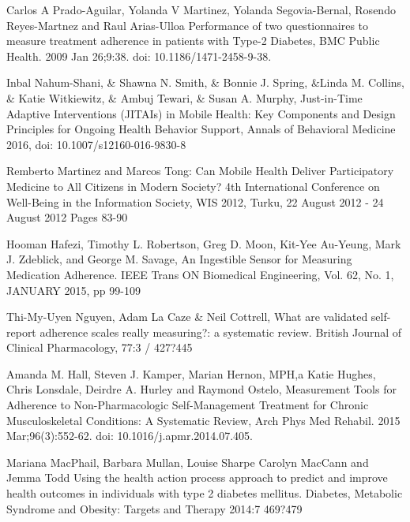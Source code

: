 \documentclass{llncs}
\begin{document}
\begin{thebibliography}{99}

 Carlos A Prado-Aguilar, Yolanda V Martinez, Yolanda Segovia-Bernal, Rosendo Reyes-Martnez and Raul Arias-Ulloa Performance of two questionnaires to measure treatment adherence in patients with Type-2 Diabetes, BMC Public Health. 2009 Jan 26;9:38. doi: 10.1186/1471-2458-9-38.


 Inbal Nahum-Shani, \& Shawna N. Smith,  \& Bonnie J. Spring,  \&Linda M. Collins,  \& Katie Witkiewitz,  \& Ambuj Tewari, \& Susan A. Murphy, Just-in-Time Adaptive Interventions (JITAIs) in Mobile Health: Key Components and Design Principles for Ongoing Health Behavior Support, Annals of Behavioral Medicine 2016, doi: 10.1007/s12160-016-9830-8

 Remberto Martinez and Marcos Tong: Can Mobile Health Deliver Participatory Medicine to  All Citizens in Modern Society? 4th International Conference on Well-Being in the Information Society, WIS 2012, Turku, 22 August 2012 - 24 August 2012 Pages 83-90

 Hooman Hafezi, Timothy L. Robertson, Greg D. Moon, Kit-Yee Au-Yeung, Mark J. Zdeblick, and George M. Savage, An Ingestible Sensor for Measuring Medication Adherence. IEEE Trans ON Biomedical Engineering, Vol. 62, No. 1, JANUARY 2015, pp 99-109

 Thi-My-Uyen Nguyen, Adam La Caze \& Neil Cottrell, What are validated
self-report adherence scales really measuring?: a systematic review. British Journal of Clinical Pharmacology, 77:3 / 427?445

 Amanda M. Hall, Steven J. Kamper, Marian Hernon, MPH,a Katie Hughes,  Chris Lonsdale, Deirdre A. Hurley and Raymond Ostelo, Measurement Tools for Adherence to Non-Pharmacologic Self-Management Treatment for Chronic Musculoskeletal Conditions: A Systematic Review, Arch Phys Med Rehabil. 2015 Mar;96(3):552-62. doi: 10.1016/j.apmr.2014.07.405.

 Mariana MacPhail, Barbara Mullan, Louise Sharpe Carolyn MacCann and Jemma Todd Using the health action process approach to predict and improve health outcomes in individuals with type 2 diabetes mellitus. Diabetes, Metabolic Syndrome and Obesity: Targets and Therapy 2014:7 469?479


\end{thebibliography}
\end{document}
